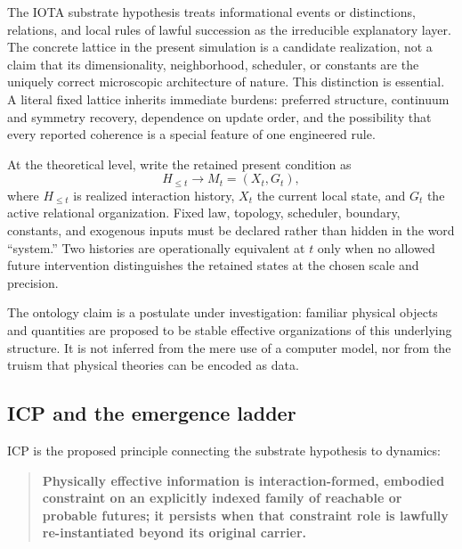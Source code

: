 The IOTA substrate hypothesis treats informational events or distinctions,
relations, and local rules of lawful succession as the irreducible explanatory
layer. The concrete lattice in the present simulation is a candidate
realization, not a claim that its dimensionality, neighborhood, scheduler, or
constants are the uniquely correct microscopic architecture of nature. This
distinction is essential. A literal fixed lattice inherits immediate burdens:
preferred structure, continuum and symmetry recovery, dependence on update
order, and the possibility that every reported coherence is a special feature
of one engineered rule.

At the theoretical level, write the retained present condition as
\begin{equation}
 H_{\le t}\longrightarrow M_t=(X_t,G_t),
 \label{eq:history-record}
\end{equation}
where $H_{\le t}$ is realized interaction history, $X_t$ the current local
state, and $G_t$ the active relational organization. Fixed law, topology,
scheduler, boundary, constants, and exogenous inputs must be declared rather
than hidden in the word ``system.'' Two histories are operationally equivalent
at $t$ only when no allowed future intervention distinguishes the retained
states at the chosen scale and precision.

The ontology claim is a postulate under investigation: familiar physical
objects and quantities are proposed to be stable effective organizations of
this underlying structure. It is not inferred from the mere use of a computer
model, nor from the truism that physical theories can be encoded as data.

\subsection{ICP and the emergence ladder}

ICP is the proposed principle connecting the substrate hypothesis to dynamics:

\begin{quote}
\textbf{Physically effective information is interaction-formed, embodied
constraint on an explicitly indexed family of reachable or probable futures;
it persists when that constraint role is lawfully re-instantiated beyond its
original carrier.}
\end{quote}

